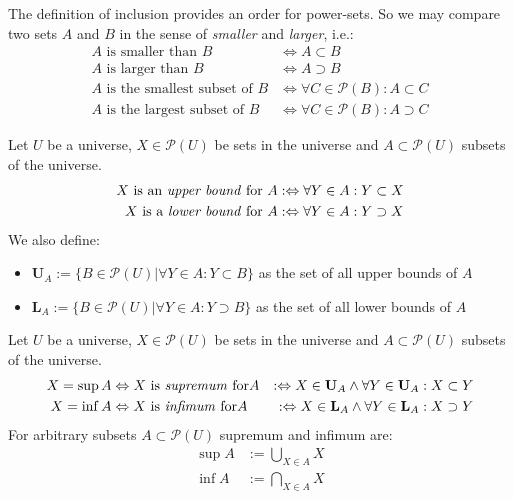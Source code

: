 The definition of inclusion provides an order for power-sets.
So we may compare two sets $A$ and $B$ in the sense of \emph{smaller} and \emph{larger}, i.e.:
\begin{align}
A \text{ is smaller than } B 
&\Leftrightarrow A \subset B
\\
A \text{ is larger than } B  
&\Leftrightarrow A \supset B
\\
A \text{ is the smallest subset of } B
&\Leftrightarrow \forall C \in \mathcal{P}(B) : A \subset C
\\
A \text{ is the largest subset of } B
&\Leftrightarrow \forall C \in \mathcal{P}(B) : A \supset C
\end{align}


\begin{definition}
Let $U$ be a universe, $X \in \mathcal{P}(U)$ be sets in the universe and $A \subset \mathcal{P}(U)$ subsets of the universe.
\begin{align}
X \text{ is an \emph{upper bound} for } A
&:\Leftrightarrow
\forall Y \in A : Y \subset X
\\
X \text{ is a \emph{lower bound} for } A
&:\Leftrightarrow
\forall Y \in A : Y \supset X
\end{align}
We also define:
\begin{itemize}
\item
$\mathbf{U}_A := \{ B \in \mathcal{P}(U) | \forall Y \in A : Y \subset B \}$
as the set of all upper bounds of $A$
\item
$\mathbf{L}_A := \{ B \in \mathcal{P}(U) | \forall Y \in A : Y \supset B \}$
as the set of all lower bounds of $A$
\end{itemize}
\end{definition}

\begin{definition}
\label{definition:SupremumAndInfimum}
Let $U$ be a universe, $X \in \mathcal{P}(U)$ be sets in the universe and $A \subset \mathcal{P}(U)$ subsets of the universe.
\begin{align}
X = \sup A
&\Leftrightarrow
X \text{ is \emph{supremum} for} A
&:\Leftrightarrow
X \in \mathbf{U}_A \wedge \forall Y \in \mathbf{U}_A : X \subset Y
\\
X = \inf A
&\Leftrightarrow
X \text{ is \emph{infimum} for} A
&:\Leftrightarrow
X \in \mathbf{L}_A \wedge \forall Y \in \mathbf{L}_A : X \supset Y
\end{align}
For arbitrary subsets $A \subset \mathcal{P}(U)$ supremum and infimum are:
\begin{align}
\sup A 
&:= \bigcup\limits_{X \in A} X
\\
\inf A 
&:= \bigcap\limits_{X \in A} X
\end{align}
\end{definition}


